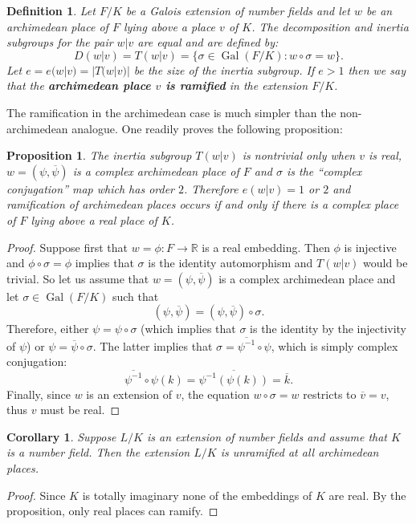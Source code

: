 \documentclass[12pt]{article}
\newtheorem{defn}{Definition}
\newtheorem{prop}{Proposition}
\newtheorem{cor}{Corollary}
\newcommand{\Reals}{\mathbb{R}}
\newcommand{\Gal}{\operatorname{Gal}}
\begin{document}
\begin{defn}
Let $F/K$ be a Galois extension of number fields and let $w$ be an archimedean place of $F$ lying above a place $v$ of $K$. The decomposition and inertia subgroups  for the pair $w|v$ are equal and are defined by:
$$D(w|v)=T(w|v)=\{ \sigma \in \Gal(F/K) : w\circ \sigma = w\}.$$
Let $e=e(w|v)=|T(w|v)|$ be the size of the inertia subgroup. If $e>1$ then we say that the {\bf archimedean place $v$ is ramified} in the extension $F/K$. 
\end{defn}

The ramification in the archimedean case is much simpler than the non-archimedean analogue. One readily proves the following proposition:
\begin{prop}
The inertia subgroup $T(w|v)$ is nontrivial only when $v$ is real, $w=(\psi,\overline{\psi})$ is a complex archimedean place of $F$ and $\sigma$ is the ``complex conjugation'' map which has order $2$. Therefore $e(w|v)=1$ or $2$ and ramification of archimedean places occurs if and only if there is a complex place of $F$ lying above a real place of $K$.
\end{prop}
\begin{proof}
Suppose first that $w=\phi\colon F\to \Reals$ is a real embedding. Then $\phi$ is injective and $\phi\circ \sigma = \phi$ implies that $\sigma$ is the identity automorphism and $T(w|v)$ would be trivial. So let us assume that $w=(\psi,\overline{\psi})$ is a complex archimedean place and let $\sigma\in \Gal(F/K)$ such that 
$$(\psi,\overline{\psi})=(\psi,\overline{\psi})\circ \sigma.$$
Therefore, either $\psi=\psi\circ \sigma$ (which implies that $\sigma$ is the identity by the injectivity of $\psi$) or $\psi=\overline{\psi}\circ \sigma$. The latter implies that $\sigma=\overline{\psi^{-1}}\circ \psi$, which is simply complex conjugation:
$$\overline{\psi^{-1}}\circ \psi(k)=\overline{\psi^{-1}(\psi(k))}=\overline{k}.$$
Finally, since $w$ is an extension of $v$, the equation $w\circ \sigma = w$ restricts to $\overline{v}=v$, thus $v$ must be real.
\end{proof}
\begin{cor}
Suppose $L/K$ is an extension of number fields and assume that $K$ is a  number field. Then the extension $L/K$ is unramified at all archimedean places.
\end{cor}
\begin{proof}
Since $K$ is totally imaginary none of the embeddings of $K$ are real. By the proposition, only real places can ramify. 
\end{proof}
\end{document}
